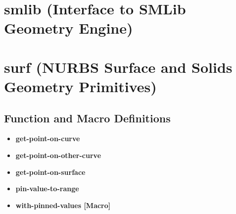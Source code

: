 \documentclass [11pt]{book}
\begin{document}
\label{sec:robot(simplifiedandroidrobotexample)}







\section{smlib (Interface to SMLib Geometry Engine)}

\label{sec:smlib(interfacetosmlibgeometryengine)}







\section{surf (NURBS Surface and Solids Geometry Primitives)}

\label{sec:surf(nurbssurfaceandsolidsgeometryprimitives)}





\subsection{Function and Macro Definitions}




\begin{itemize}

\item {}
\label{prim:get-point-on-curve}
\textbf{get-point-on-curve}





\item {}
\label{prim:get-point-on-other-curve}
\textbf{get-point-on-other-curve}





\item {}
\label{prim:get-point-on-surface}
\textbf{get-point-on-surface}





\item {}
\label{prim:pin-value-to-range}
\textbf{pin-value-to-range}





\item {}
\label{prim:with-pinned-values}
\textbf{with-pinned-values [Macro]}





\end{itemize}
\end{document}

